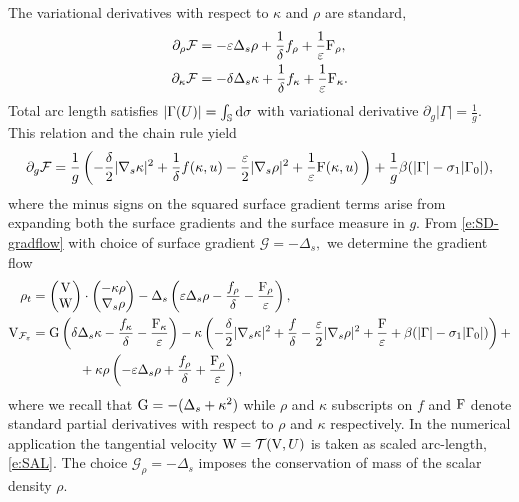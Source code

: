 \documentclass[11pt]{amsart}
\theoremstyle{plain}
\newcommand{\beq}{\begin{equation}}
\newcommand{\eeq}{\end{equation}}
\def\cF{{\mathcal F}}
\def\cG{{\mathcal G}}
\def\cT{{\mathcal T}}
\def\mbbS{\mathbb{S}}
\def\mrF{\textrm F}
\def\mrG{\textrm G}
\def\mrV{\textrm V}
\def\mrW{\textrm W}
\def\mrd{\textrm d}
\def\eps{\varepsilon}
\def\cF{{\mathcal F}}
\def\bpm{\begin{pmatrix}}
\def\epm{\end{pmatrix}}
\numberwithin{equation}{section}
\theoremstyle{plain}
\begin{document}
The variational derivatives with respect to $\kappa$ and $\rho$ are standard,
$$\begin{aligned}
 \partial_\rho\cF&= -\eps\Delta_s\rho +\frac{1}{\delta} f_\rho+\frac{1}{\eps}\mrF_\rho,\\
 \partial_\kappa \cF&=-\delta \Delta_s\kappa +\frac{1}{\delta} f_\kappa+\frac{1}{\eps}\mrF_\kappa.
 \end{aligned}$$
 Total arc length satisfies $|\Gamma(U)|=\int_\mbbS \mrd \sigma$ with variational derivative $\partial_g |\Gamma|= \frac{1}{g}. $ This relation and the chain rule yield
 $$
 \partial_g\cF=\frac{1}{g} \left(-\frac{\delta}{2}|\nabla_s \kappa|^2+ \frac{1}{\delta}f(\kappa,u)- \frac{\varepsilon}{2}|\nabla_s \rho|^2+ \frac{1}{\eps}\mrF(\kappa,u)\,\right)+\frac{1}{g}\beta(|\Gamma|-\sigma_1|\Gamma_0|),$$
 where the minus signs on the squared surface gradient terms arise from expanding both the surface gradients and the surface measure in $g.$ 
From \eqref{e:SD-gradflow} with choice of surface gradient $\cG=-\Delta_s,$ we determine the gradient flow
\beq\label{e:FM-GF}
\begin{aligned}
\rho_t&=\bpm \mrV\cr\mrW\epm\cdot \bpm-\kappa\rho \cr \nabla_s\rho \epm -\Delta_s\left( \eps\Delta_s\rho -\frac{f_\rho}{\delta}-\frac{\mrF_\rho}{\eps} \right),\\
\mrV_{\cF_\eps}&= \mrG\left( \delta\Delta_s\kappa-\frac{f_\kappa}{\delta}-\frac{\mrF_\kappa}{\eps} \right) -\kappa\left(-\frac{\delta}{2}|\nabla_s \kappa|^2+ \frac{f}{\delta}- \frac{\varepsilon}{2}|\nabla_s \rho|^2+ \frac{\mrF}{\eps} + \beta(|\Gamma|-\sigma_1|\Gamma_0|)\right) +\\
&\hspace{0.5in}+\kappa\rho\left(-\eps\Delta_s\rho +\frac{f_\rho}{\delta}+\frac{\mrF_\rho}{\eps}\right),
\end{aligned} 
\eeq
where  we recall that $\mrG=-(\Delta_s+\kappa^2)$ while $\rho$ and $\kappa$ subscripts on $f$ and $\mrF$ denote standard partial derivatives with respect to $\rho$ and $\kappa$ respectively.  In the numerical application the tangential velocity $\mrW=\cT(\mrV, U)$ is taken as scaled arc-length, \eqref{e:SAL}. The choice $\cG_\rho=-\Delta_s$ imposes the conservation of mass of the scalar density $\rho.$
\end{document}
